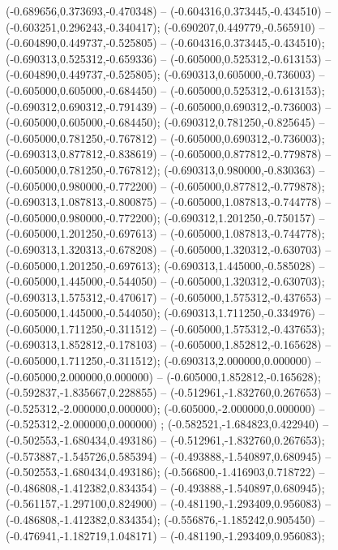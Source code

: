 (-0.689656,0.373693,-0.470348) -- (-0.604316,0.373445,-0.434510) -- (-0.603251,0.296243,-0.340417);
 (-0.690207,0.449779,-0.565910) -- (-0.604890,0.449737,-0.525805) -- (-0.604316,0.373445,-0.434510);
 (-0.690313,0.525312,-0.659336) -- (-0.605000,0.525312,-0.613153) -- (-0.604890,0.449737,-0.525805);
 (-0.690313,0.605000,-0.736003) -- (-0.605000,0.605000,-0.684450) -- (-0.605000,0.525312,-0.613153);
 (-0.690312,0.690312,-0.791439) -- (-0.605000,0.690312,-0.736003) -- (-0.605000,0.605000,-0.684450);
 (-0.690312,0.781250,-0.825645) -- (-0.605000,0.781250,-0.767812) -- (-0.605000,0.690312,-0.736003);
 (-0.690313,0.877812,-0.838619) -- (-0.605000,0.877812,-0.779878) -- (-0.605000,0.781250,-0.767812);
 (-0.690313,0.980000,-0.830363) -- (-0.605000,0.980000,-0.772200) -- (-0.605000,0.877812,-0.779878);
 (-0.690313,1.087813,-0.800875) -- (-0.605000,1.087813,-0.744778) -- (-0.605000,0.980000,-0.772200);
 (-0.690312,1.201250,-0.750157) -- (-0.605000,1.201250,-0.697613) -- (-0.605000,1.087813,-0.744778);
 (-0.690313,1.320313,-0.678208) -- (-0.605000,1.320312,-0.630703) -- (-0.605000,1.201250,-0.697613);
 (-0.690313,1.445000,-0.585028) -- (-0.605000,1.445000,-0.544050) -- (-0.605000,1.320312,-0.630703);
 (-0.690313,1.575312,-0.470617) -- (-0.605000,1.575312,-0.437653) -- (-0.605000,1.445000,-0.544050);
 (-0.690313,1.711250,-0.334976) -- (-0.605000,1.711250,-0.311512) -- (-0.605000,1.575312,-0.437653);
 (-0.690313,1.852812,-0.178103) -- (-0.605000,1.852812,-0.165628) -- (-0.605000,1.711250,-0.311512);
 (-0.690313,2.000000,0.000000) -- (-0.605000,2.000000,0.000000) -- (-0.605000,1.852812,-0.165628);
 (-0.592837,-1.835667,0.228855) -- (-0.512961,-1.832760,0.267653) -- (-0.525312,-2.000000,0.000000);
 (-0.605000,-2.000000,0.000000) -- (-0.525312,-2.000000,0.000000) ;
 (-0.582521,-1.684823,0.422940) -- (-0.502553,-1.680434,0.493186) -- (-0.512961,-1.832760,0.267653);
 (-0.573887,-1.545726,0.585394) -- (-0.493888,-1.540897,0.680945) -- (-0.502553,-1.680434,0.493186);
 (-0.566800,-1.416903,0.718722) -- (-0.486808,-1.412382,0.834354) -- (-0.493888,-1.540897,0.680945);
 (-0.561157,-1.297100,0.824900) -- (-0.481190,-1.293409,0.956083) -- (-0.486808,-1.412382,0.834354);
 (-0.556876,-1.185242,0.905450) -- (-0.476941,-1.182719,1.048171) -- (-0.481190,-1.293409,0.956083);
